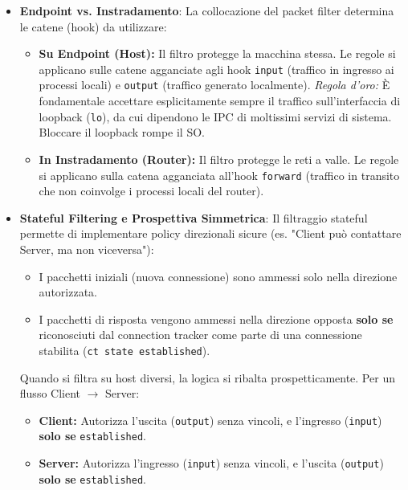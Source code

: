 \documentclass[12pt, a4paper]{report}
\begin{document}
\begin{itemize}
	\item \textbf{Endpoint vs. Instradamento}: La collocazione del packet filter determina le catene (hook) da utilizzare:
	\begin{itemize}
		\item \textbf{Su Endpoint (Host):} Il filtro protegge la macchina stessa. Le regole si applicano sulle catene agganciate agli hook \texttt{input} (traffico in ingresso ai processi locali) e \texttt{output} (traffico generato localmente). \textit{Regola d'oro:} È fondamentale accettare esplicitamente sempre il traffico sull'interfaccia di loopback (\texttt{lo}), da cui dipendono le IPC di moltissimi servizi di sistema. Bloccare il loopback rompe il SO.
		\item \textbf{In Instradamento (Router):} Il filtro protegge le reti a valle. Le regole si applicano sulla catena agganciata all'hook \texttt{forward} (traffico in transito che non coinvolge i processi locali del router).
	\end{itemize}
	
	\item \textbf{Stateful Filtering e Prospettiva Simmetrica}: Il filtraggio stateful permette di implementare policy direzionali sicure (es. "Client può contattare Server, ma non viceversa"):
	\begin{itemize}
		\item I pacchetti iniziali (nuova connessione) sono ammessi solo nella direzione autorizzata.
		\item I pacchetti di risposta vengono ammessi nella direzione opposta \textbf{solo se} riconosciuti dal connection tracker come parte di una connessione stabilita (\texttt{ct state established}).
	\end{itemize}
	Quando si filtra su host diversi, la logica si ribalta prospetticamente. Per un flusso Client $\rightarrow$ Server:
	\begin{itemize}
		\item \textbf{Client:} Autorizza l'uscita (\texttt{output}) senza vincoli, e l'ingresso (\texttt{input}) \textbf{solo se} \texttt{established}.
		\item \textbf{Server:} Autorizza l'ingresso (\texttt{input}) senza vincoli, e l'uscita (\texttt{output}) \textbf{solo se} \texttt{established}.
	\end{itemize}
	

\end{itemize}
\end{document}
